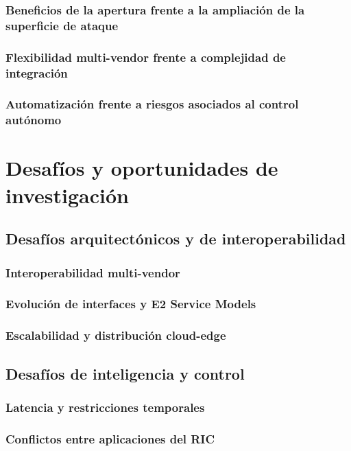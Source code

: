 \documentclass[11pt,a4paper]{article}
\makeatletter
\let\ORIGsection\section
\def\section{\@nobreakfalse\ORIGsection}
\let\ORIGsubsection\subsection
\def\subsection{\@nobreakfalse\ORIGsubsection}
\let\ORIGsubsubsection\subsubsection
\def\subsubsection{\@nobreakfalse\ORIGsubsubsection}
\makeatother
\begin{document}
\subsubsection{Beneficios de la apertura frente a la ampliación de la superficie de ataque}
\subsubsection{Flexibilidad multi-vendor frente a complejidad de integración}
\subsubsection{Automatización frente a riesgos asociados al control autónomo}


\section{Desafíos y oportunidades de investigación}

\subsection{Desafíos arquitectónicos y de interoperabilidad}

\subsubsection{Interoperabilidad multi-vendor}
\subsubsection{Evolución de interfaces y E2 Service Models}
\subsubsection{Escalabilidad y distribución cloud-edge}

\subsection{Desafíos de inteligencia y control}

\subsubsection{Latencia y restricciones temporales}
\subsubsection{Conflictos entre aplicaciones del RIC}
\end{document}
